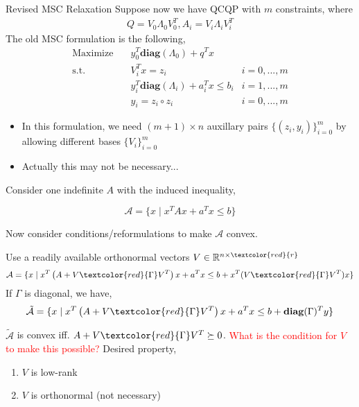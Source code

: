 \documentclass[aspectratio=1610, 9pt]{beamer}
\newcommand{\diag}{\textbf{diag}}
\newcommand{\red}[1]{\textcolor{red}{#1}}
\newcommand{\real}{\mathbb{R}}
\begin{document}
\begin{frame}[allowframebreaks]{Revised MSC Relaxation}
  Suppose now we have QCQP with \(m\) constraints, where
  \begin{align*}
    Q = V_0\Lambda_0V_0^T, A_i = V_i\Lambda_iV_i^T
  \end{align*}
  The old MSC formulation is the following,
  \begin{align}
    \nonumber \mathrm{Maximize}\quad & y_0 ^T\diag(\Lambda_0) + q^Tx                         \\
    \mathrm{s.t.} \quad              & V_i^T x = z_i                             & i=0,...,m \\
                                     & y_i ^T\diag(\Lambda_i)  + a_i^Tx  \le b_i & i=1,...,m \\
    \label{quad}                     & y_i = z_i \circ z_i                       & i=0,...,m
  \end{align}
  \begin{itemize}
    \item In this formulation, we need \((m + 1) \times n\) auxillary pairs \(\{(z_i, y_i)\}_{i=0}^m\) by allowing different bases \(\{V_i\}_{i=0}^m\)
    \item Actually this may not be necessary...
  \end{itemize}

  \framebreak
  Consider one indefinite \(A\) with the induced inequality,

  \[\mathcal A =  \{x \mid x^TAx +a^Tx \le b\}\]

  Now consider conditions/reformulations to make \(\mathcal A\) convex.

  Use a readily available orthonormal vectors \(V \in \real^{n\times\red{r}}\)
  \[\mathcal A =  \{x \mid x^T\left(A + V\red{\Gamma}V^T\right )x +a^Tx \le b + x^T(V\red{\Gamma}V^T)x\}\]
  If \(\Gamma\) is diagonal, we have,
  \[\tilde {\mathcal  A} =  \{x \mid x^T\left(A + V\red{\Gamma}V^T\right )x + a^Tx \le b +\diag(\Gamma)^T y\}\]


  \(\tilde {\mathcal  A}\) is convex iff. \(A + V\red{\Gamma}V^T \succeq 0\). \red{What is the condition for \(V\) to make this possible?} Desired property,
  \begin{enumerate}
    \item \(V\) is low-rank
    \item \(V\) is orthonormal (not necessary)
  \end{enumerate}

\end{frame}
\end{document}

